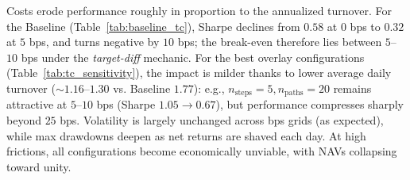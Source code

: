 Costs erode performance roughly in proportion to the annualized turnover. For the Baseline (Table~\ref{tab:baseline_tc}), Sharpe declines from \(0.58\) at \(0\) bps to \(0.32\) at \(5\) bps, and turns negative by \(10\) bps; the break-even therefore lies between \(5\)–\(10\) bps under the \textit{target-diff} mechanic. For the best overlay configurations (Table~\ref{tab:tc_sensitivity}), the impact is milder thanks to lower average daily turnover (\(\sim1.16\)–\(1.30\) vs. Baseline \(1.77\)): e.g., \(n_{\text{steps}}=5, n_{\text{paths}}=20\) remains attractive at \(5\)–\(10\) bps (Sharpe \(1.05 \to 0.67\)), but performance compresses sharply beyond \(25\) bps. Volatility is largely unchanged across bps grids (as expected), while max drawdowns deepen as net returns are shaved each day. At high frictions, all configurations become economically unviable, with NAVs collapsing toward unity.





